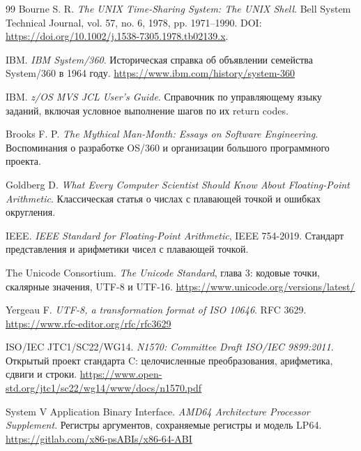 \begin{thebibliography}{99}
Bourne S. R. \textit{The UNIX Time-Sharing System: The UNIX Shell}.
Bell System Technical Journal, vol. 57, no. 6, 1978, pp. 1971--1990.
DOI: \url{https://doi.org/10.1002/j.1538-7305.1978.tb02139.x}.

IBM. \textit{IBM System/360}. Историческая справка об объявлении семейства System/360 в 1964 году.
\url{https://www.ibm.com/history/system-360}

IBM. \textit{z/OS MVS JCL User's Guide}. Справочник по управляющему языку заданий, включая условное выполнение шагов по их return codes.

Brooks F. P. \textit{The Mythical Man-Month: Essays on Software Engineering}.
Воспоминания о разработке OS/360 и организации большого программного проекта.

Goldberg D. \textit{What Every Computer Scientist Should Know About Floating-Point Arithmetic}. Классическая статья о числах с плавающей точкой и ошибках округления.

IEEE. \textit{IEEE Standard for Floating-Point Arithmetic}, IEEE 754-2019.
Стандарт представления и арифметики чисел с плавающей точкой.

The Unicode Consortium. \textit{The Unicode Standard}, глава 3:
кодовые точки, скалярные значения, UTF-8 и UTF-16.
\url{https://www.unicode.org/versions/latest/}

Yergeau F. \textit{UTF-8, a transformation format of ISO 10646}. RFC 3629.
\url{https://www.rfc-editor.org/rfc/rfc3629}

ISO/IEC JTC1/SC22/WG14. \textit{N1570: Committee Draft ISO/IEC 9899:2011}.
Открытый проект стандарта C: целочисленные преобразования, арифметика,
сдвиги и строки.
\url{https://www.open-std.org/jtc1/sc22/wg14/www/docs/n1570.pdf}

System V Application Binary Interface. \textit{AMD64 Architecture Processor
Supplement}. Регистры аргументов, сохраняемые регистры и модель LP64.
\url{https://gitlab.com/x86-psABIs/x86-64-ABI}

\end{thebibliography}
